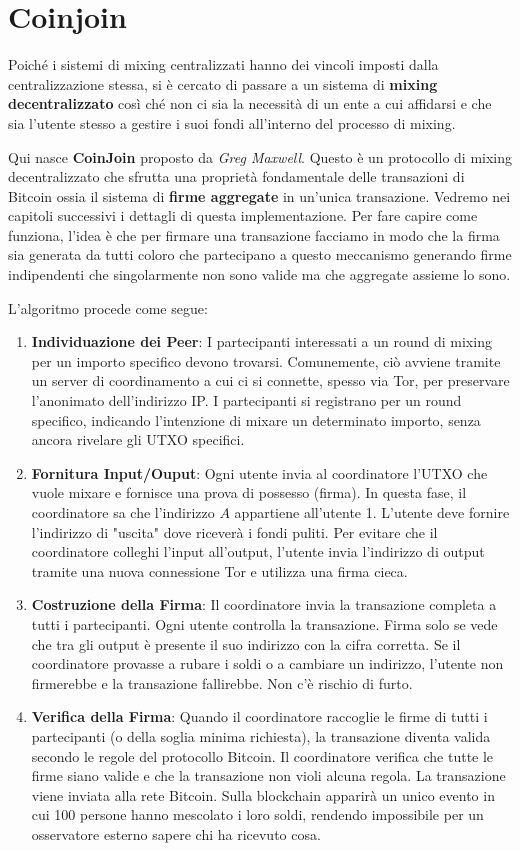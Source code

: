 \section{Coinjoin}
Poiché i sistemi di mixing centralizzati hanno dei vincoli imposti dalla centralizzazione stessa, si è cercato di passare a un sistema di \textbf{mixing decentralizzato} così ché non ci sia la necessità di un ente a cui affidarsi e che sia l'utente stesso a gestire i suoi fondi all'interno del processo di mixing.

Qui nasce \textbf{CoinJoin} proposto da \textit{Greg Maxwell}. Questo è un protocollo di mixing decentralizzato che sfrutta una proprietà fondamentale delle transazioni di Bitcoin ossia il sistema di \textbf{firme aggregate} in un'unica transazione. Vedremo nei capitoli successivi i dettagli di questa implementazione. Per fare capire come funziona, l'idea è che per firmare una transazione facciamo in modo che la firma sia generata da tutti coloro che partecipano a questo meccanismo generando firme indipendenti che singolarmente non sono valide ma che aggregate assieme lo sono. 

L'algoritmo procede come segue:
\begin{enumerate}
    \item \textbf{Individuazione dei Peer}: I partecipanti interessati a un round di mixing per un importo specifico devono trovarsi. Comunemente, ciò avviene tramite un server di coordinamento a cui ci si connette, spesso via Tor, per preservare l’anonimato dell’indirizzo IP. I partecipanti si registrano per un round specifico, indicando l’intenzione di mixare un determinato importo, senza ancora rivelare gli UTXO specifici.
    \item \textbf{Fornitura Input/Ouput}: Ogni utente invia al coordinatore l'UTXO che vuole mixare e fornisce una prova di possesso (firma). In questa fase, il coordinatore sa che l'indirizzo $A$ appartiene all'utente 1. L'utente deve fornire l'indirizzo di "uscita" dove riceverà i fondi puliti. 
    Per evitare che il coordinatore colleghi l'input all'output, l'utente invia l'indirizzo di output tramite una nuova connessione Tor e utilizza una firma cieca.
    \item \textbf{Costruzione della Firma}: Il coordinatore invia la transazione completa a tutti i partecipanti.
    Ogni utente controlla la transazione. Firma solo se vede che tra gli output è presente il suo indirizzo con la cifra corretta.
    Se il coordinatore provasse a rubare i soldi o a cambiare un indirizzo, l'utente non firmerebbe e la transazione fallirebbe. Non c'è rischio di furto.
    \item \textbf{Verifica della Firma}: Quando il coordinatore raccoglie le firme di tutti i partecipanti (o della soglia minima richiesta), la transazione diventa valida secondo le regole del protocollo Bitcoin.
    Il coordinatore verifica che tutte le firme siano valide e che la transazione non violi alcuna regola. La transazione viene inviata alla rete Bitcoin. Sulla blockchain apparirà un unico evento in cui 100 persone hanno mescolato i loro soldi, rendendo impossibile per un osservatore esterno sapere chi ha ricevuto cosa.
\end{enumerate}

